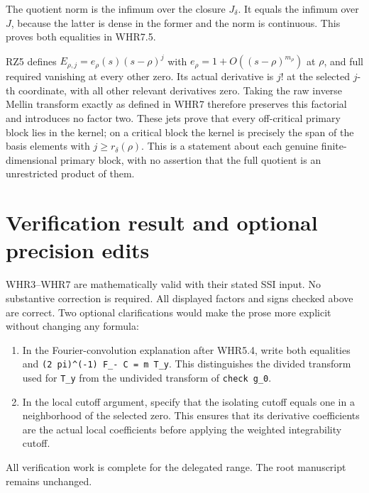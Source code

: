 The quotient norm is the infimum over the closure \(J_\delta\). It
equals the infimum over \(J\), because the latter is dense in the former
and the norm is continuous. This proves both equalities in WHR7.5.

RZ5 defines \(E_{\rho,j}=e_\rho(s)(s-\rho)^j\) with
\(e_\rho=1+O((s-\rho)^{m_\rho})\) at \(\rho\), and full required
vanishing at every other zero. Its actual derivative is \(j!\) at the
selected \(j\)-th coordinate, with all other relevant derivatives zero.
Taking the raw inverse Mellin transform exactly as defined in WHR7
therefore preserves this factorial and introduces no factor two. These
jets prove that every off-critical primary block lies in the kernel; on
a critical block the kernel is precisely the span of the basis elements
with \(j\ge r_\delta(\rho)\). This is a statement about each genuine
finite-dimensional primary block, with no assertion that the full
quotient is an unrestricted product of them.

\section{Verification result and optional precision
edits}\label{verification-result-and-optional-precision-edits}

WHR3--WHR7 are mathematically valid with their stated SSI input. No
substantive correction is required. All displayed factors and signs
checked above are correct. Two optional clarifications would make the
prose more explicit without changing any formula:

\begin{enumerate}
\def\labelenumi{\arabic{enumi}.}
\tightlist
\item
  In the Fourier-convolution explanation after WHR5.4, write both
  equalities  and
  \texttt{(2\ pi)\^{}(-1)\ F\_-\ C\ =\ m\ T\_y}. This distinguishes the
  divided transform used for \texttt{T\_y} from the undivided transform
  of \texttt{check\ g\_0}.
\item
  In the local cutoff argument, specify that the isolating cutoff equals
  one in a neighborhood of the selected zero. This ensures that its
  derivative coefficients are the actual local coefficients before
  applying the weighted integrability cutoff.
\end{enumerate}

All verification work is complete for the delegated range. The root
manuscript remains unchanged.

